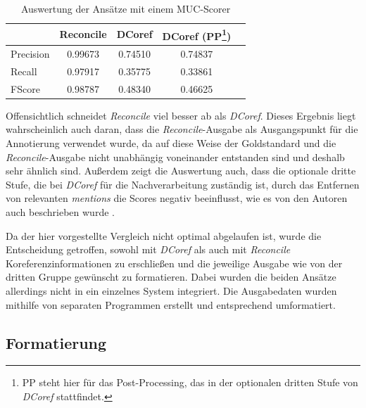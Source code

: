 \documentclass[a4paper,12pt,titlepage=true, ngerman]{scrartcl}
\begin{document}
\begin{savenotes}
	\begin{table}[ht]
		\centering
  		\begin{tabular}{ l || c | c | c ||  r }
						& Reconcile 	& DCoref 	& DCoref (PP\footnote[1]{PP steht hier für das Post-Processing, das in der optionalen dritten Stufe von \emph{DCoref} stattfindet.}) 	& \\ \hline \hline
    			Precision 	& 0.99673 	& 0.74510	& 0.74837		& \\ \hline
    			Recall     	& 0.97917 	& 0.35775 	& 0.33861 		& \\ \hline
    			FScore    	& 0.98787  	& 0.48340 	& 0.46625 		& \\ \hline
  		\end{tabular}
  		\caption{Auswertung der Ansätze mit einem MUC-Scorer}
  		\label{score:ergebnis}
	\end{table}
\end{savenotes}

Offensichtlich schneidet \emph{Reconcile} viel besser ab als \emph{DCoref}. 
Dieses Ergebnis liegt wahrscheinlich auch daran, dass die \emph{Reconcile}-Ausgabe als 
Ausgangspunkt für die Annotierung verwendet wurde, da auf diese Weise der Goldstandard und 
die \emph{Reconcile}-Ausgabe nicht unabhängig voneinander entstanden sind und deshalb sehr ähnlich sind. 
Außerdem zeigt die Auswertung auch, dass die optionale dritte Stufe, 
die bei \emph{DCoref} für die Nachverarbeitung zuständig ist, 
durch das Entfernen von relevanten \emph{mentions} die Scores negativ beeinflusst, 
wie es von den Autoren auch beschrieben wurde \autocite[29, 32]{chris_leeetal}.

Da der hier vorgestellte Vergleich nicht optimal abgelaufen ist, wurde die Entscheidung getroffen, 
sowohl mit \emph{DCoref} als auch mit \emph{Reconcile} Koreferenzinformationen zu erschließen 
und die jeweilige Ausgabe wie von der dritten Gruppe gewünscht zu formatieren. 
Dabei wurden die beiden Ansätze allerdings nicht in ein einzelnes System integriert. 
Die Ausgabedaten wurden mithilfe von separaten Programmen erstellt und entsprechend umformatiert.



\subsection{Formatierung}\label{Verlauf:Formatierung}%
\end{document}
